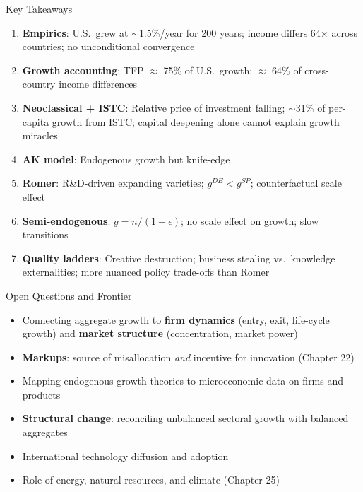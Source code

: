 \documentclass[blue]{beamer}
\begin{document}
		\begin{frame}{Key Takeaways}
			\begin{enumerate}
				\item \textbf{Empirics}: U.S.\ grew at $\sim$1.5\%/year for 200 years; income differs 64$\times$ across countries; no unconditional convergence
				
				\item \textbf{Growth accounting}: TFP $\approx$ 75\% of U.S.\ growth; $\approx$ 64\% of cross-country income differences
				
				\item \textbf{Neoclassical + ISTC}: Relative price of investment falling; $\sim$31\% of per-capita growth from ISTC; capital deepening alone cannot explain growth miracles
				
				\item \textbf{AK model}: Endogenous growth but knife-edge
				
				\item \textbf{Romer}: R\&D-driven expanding varieties; $g^{DE} < g^{SP}$; counterfactual scale effect
				
				\item \textbf{Semi-endogenous}: $g = n/(1-\epsilon)$; no scale effect on growth; slow transitions
				
				\item \textbf{Quality ladders}: Creative destruction; business stealing vs.\ knowledge externalities; more nuanced policy trade-offs than Romer
			\end{enumerate}
		\end{frame}
		
		\begin{frame}{Open Questions and Frontier}
			\begin{itemize}
				\item Connecting aggregate growth to \textbf{firm dynamics} (entry, exit, life-cycle growth) and \textbf{market structure} (concentration, market power)
				\item \textbf{Markups}: source of misallocation \emph{and} incentive for innovation (Chapter 22)
				\item Mapping endogenous growth theories to microeconomic data on firms and products
				\item \textbf{Structural change}: reconciling unbalanced sectoral growth with balanced aggregates
				\item International technology diffusion and adoption
				\item Role of energy, natural resources, and climate (Chapter 25)
			\end{itemize}
		\end{frame}
	
\end{document}
